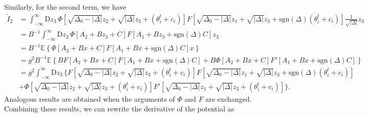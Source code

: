 \documentclass[reprint,amsmath,amssymb,aps]{revtex4-2}
\begin{document}
Similarly, for the second term, we have
\begin{align}
\label{eq:lemmastein2}
    \tilde{I}_2
    &=
    \int_{-\infty}^{\infty} \mathrm{D}z_3 \, \Phi\left[ \sqrt{\Delta_0 - |\Delta|} z_2 + \sqrt{|\Delta|}z_3 + (\theta_i^t + c_i)\right] F\left[ \sqrt{\Delta_0 - |\Delta|} z_1 + \sqrt{|\Delta|}z_3 + \mathrm{sgn}(\Delta) (\theta_i^t + c_i)\right] \frac{1}{ \sqrt{|\Delta|}} z_3 
    \nonumber
    \\
    &=
    B^{-1} \int_{-\infty}^{\infty} \mathrm{D}z_3 \, \Phi\left[ A_2 + B z_3 + C\right] F\left[ A_1 + B z_3 + \mathrm{sgn}(\Delta) C\right] z_3
    \nonumber
    \\
    &=
    B^{-1} \mathbb{E}\left\{ \Phi\left[ A_2 + B x + C\right] F\left[ A_1 + B x + \mathrm{sgn}(\Delta) C\right] x \right\}
    \nonumber
    \\
    &=
    g^2 B^{-1} \mathbb{E}\left\{ B F\left[ A_2 + B x + C\right] F\left[ A_1 + B x + \mathrm{sgn}(\Delta) C\right] + B \Phi\left[ A_2 + B x + C\right] F'\left[ A_1 + B x + \mathrm{sgn}(\Delta) C\right] \right\}
    \nonumber
    \\
    &=
    g^2 \int_{-\infty}^{\infty} \mathrm{D}z_3 \, \Bigg\{ F\left[ \sqrt{\Delta_0 - |\Delta|} z_2 + \sqrt{|\Delta|}z_3 + (\theta_i^t + c_i)\right] F\left[ \sqrt{\Delta_0 - |\Delta|} z_1 + \sqrt{|\Delta|}z_3 + \mathrm{sgn}(\Delta) (\theta_i^t + c_i)\right] 
    \nonumber
    \\
    & +
    \Phi\left[ \sqrt{\Delta_0 - |\Delta|} z_2 + \sqrt{|\Delta|}z_3 + (\theta_i^t + c_i)\right] F'\left[ \sqrt{\Delta_0 - |\Delta|} z_1 + \sqrt{|\Delta|}z_3 + (\theta_i^t + c_i)\right] \Bigg\}.
\end{align}
Analogous results are obtained when the arguments of $\Phi$ and $F$ are exchanged.  
Combining these results, we can rewrite the derivative of the potential as
\end{document}
